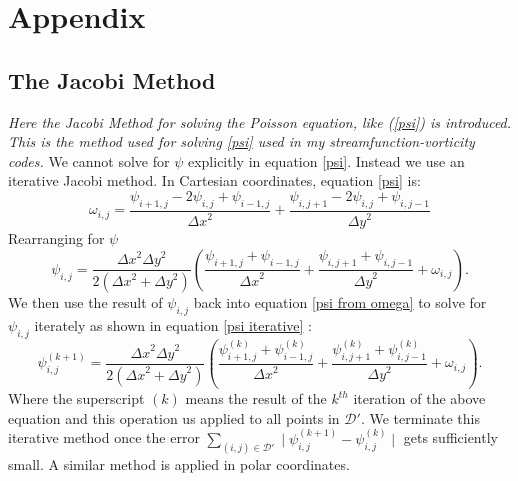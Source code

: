 \documentclass{article}
\begin{document}
\newpage
\section*{Appendix}
	\subsection*{The Jacobi Method}
	{\it{Here the Jacobi Method for solving the Poisson equation, like (\ref{psi}) is introduced. This is the method used for solving \ref{psi} used in my streamfunction-vorticity codes.}}
	\vspace{0.3cm}
	\newline
	We cannot solve for $\psi$ explicitly in equation \ref{psi}. Instead we use an iterative Jacobi method. In Cartesian coordinates, equation \ref{psi} is:
	\begin{equation}
		\omega_{i,j} = \frac{\psi_{i+1,j} - 2 \psi_{i,j} + \psi_{i-1,j}  }{{\Delta x}^2} + \frac{\psi_{i,j+1} - 2 \psi_{i,j} + \psi_{i,j-1}  }{{\Delta y}^2}
		\label{psi disc}
	\end{equation}
	Rearranging for $\psi$
	\begin{equation}
		\psi_{i,j} = \frac{{\Delta x}^2 {\Delta y}^2  }{2({\Delta x}^2  + {\Delta y}^2)} (\frac{\psi_{i+1,j} +\psi_{i-1,j} }{{\Delta x}^2} + \frac{\psi_{i,j+1} +\psi_{i,j-1}  }{{\Delta y}^2 }  + \omega_{i,j}).
		\label{psi from omega}
	\end{equation}
	We then use the result of $\psi_{i,j}$ back into equation \ref{psi from omega} to solve for $\psi_{i,j}$ iterately as shown in equation \ref{psi iterative} \cite{burkardt2011jacobi, adair2015developing}:
	\begin{equation}
		\psi_{i,j}^{(k+1)} = \frac{{\Delta x}^2 {\Delta y}^2  }{2({\Delta x}^2  + {\Delta y}^2)} (\frac{\psi_{i+1,j}^{(k)} +\psi_{i-1,j}^{(k)}  }{{\Delta x}^2} + \frac{\psi_{i,j+1}^{(k)} +\psi_{i,j-1}^{(k)}  }{{\Delta y}^2 } + \omega_{i,j}).
		\label{psi iterative}
	\end{equation}
	Where the superscript $(k)$ means the result of the $k^{th}$ iteration of the above equation and this operation us applied to all points in $\mathcal{D}'$.
	 We terminate this iterative method once the error $\sum_{(i,j) \in \mathcal{D'}} \mid \psi_{i,j}^{(k+1)} - \psi_{i,j}^{(k)} \mid$ gets sufficiently small. A similar method is applied in polar coordinates. 



\end{document}
